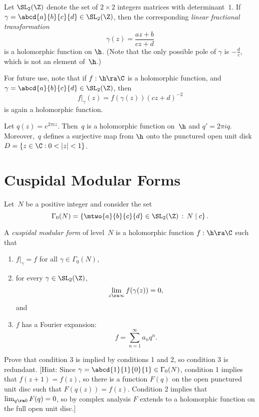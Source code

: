 \documentclass[11pt]{report}
\begin{document}
\begin{example}
  Let $\SL_2(\Z)$ denote the set of $2\times 2$ integers matrices
  with determinant~$1$.   If $\gamma=\abcd{a}{b}{c}{d}\in\SL_2(\Z)$,
  then the corresponding {\em linear fractional transformation}
  $$
    \gamma(z) = \frac{az+b}{cz+d}
  $$
  is a holomorphic function on $\h$.  (Note that the only possible
  pole of $\gamma$ is $-\frac{d}{c}$, which is not an element of~$\h$.)

  For future use, note that if $f : \h\ra \C$ is a holomorphic
  function, and $\gamma=\abcd{a}{b}{c}{d}\in\SL_2(\Z)$, then
  $$
    f|_\gamma(z) = f(\gamma(z)) (cz+d)^{-2}
  $$
  is again a holomorphic function.
\end{example}

\begin{example}
  Let $q(z) = e^{2\pi i z}$.  Then~$q$ is a holomorphic function
  on~$\h$ and $q'=2\pi i q$.  Moreover,~$q$ defines a surjective
  map from $\h$ onto the punctured open unit
  disk $D=\{z\in\C : 0<|z|<1\}$.
\end{example}

\section{Cuspidal Modular Forms}
Let~$N$ be a positive integer and consider the set
$$
  \Gamma_0(N) = \left\{\mtwo{a}{b}{c}{d}\in\SL_2(\Z) \,:\, N \mid c\right\}.
$$

\begin{definition}
  A {\em cuspidal modular form} of level~$N$ is a holomorphic function
  $
    f : \h \ra \C
  $
  such that
  \begin{enumerate}
    \item
          $f|_\gamma = f$ for all $\gamma\in\Gamma_0(N)$,
    \item
          for every $\gamma\in\SL_2(\Z)$,
          $$\lim_{z\ra \infty} f(\gamma(z)) = 0,$$ and
    \item
          $f$ has a Fourier expansion:
          $$
            f = \sum_{n=1}^{\infty} a_n  q^n.
          $$
  \end{enumerate}
\end{definition}

\begin{exercise}
  Prove that condition 3 is implied by conditions 1 and 2, so condition
  3 is redundant.  [Hint: Since
      $\gamma=\abcd{1}{1}{0}{1}\in\Gamma_0(N)$, condition 1 implies that
      $f(z+1)=f(z)$, so there is a function $F(q)$ on the open punctured
      unit disc such that $F(q(z)) = f(z)$.
      Condition 2 implies that $\lim_{q\ra 0} F(q) = 0$,
      so by complex analysis $F$ extends to a holomorphic function on the
      full open unit disc.]


\end{exercise}
\end{document}
